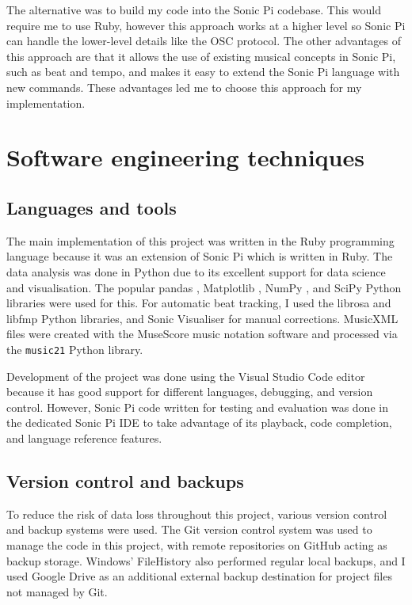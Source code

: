 \documentclass[12pt,twoside,openright]{report}
\begin{document}
The alternative was to build my code into the Sonic Pi codebase. This would
require me to use Ruby, however this approach works at a higher level so Sonic Pi can
handle the lower-level details like the OSC protocol. The other advantages of this approach are
that it allows the use of existing musical concepts in Sonic Pi, such as beat and
tempo, and makes it easy to extend the Sonic Pi language with new commands.
These advantages led me to choose this approach for my implementation.



\section{Software engineering techniques} \label{software_engineering_techniques}

\subsection{Languages and tools} \label{languages_and_tools}

The main implementation of this project was written in the Ruby programming
language because it was an extension of Sonic Pi which is written in Ruby. The
data analysis was done in Python due to its excellent support for data science
and visualisation. The popular pandas \cite{reback2020,mckinney2010}, Matplotlib \cite{hunter2007}, NumPy \cite{harris2020}, and SciPy \cite{virtanen2020} Python
libraries were used for this. For automatic beat tracking, I used the librosa \cite{mcfee2021} and libfmp \cite{mueller2021} Python libraries, and Sonic Visualiser \cite{cannam2010} for manual corrections.
MusicXML \cite{good2001} files were created with the MuseScore music notation software and
processed via the \verb'music21' \cite{cuthbert2010} Python library.

Development of the project was done using the Visual Studio Code editor because
it has good support for different languages, debugging, and version control.
However, Sonic Pi code written for testing and evaluation was done in the
dedicated Sonic Pi IDE to take advantage of its playback, code completion, and
language reference features.


\subsection{Version control and backups}

To reduce the risk of data loss throughout this project, various version control
and backup systems were used. The Git version control system was used to manage
the code in this project, with remote repositories on GitHub acting as backup
storage. Windows' FileHistory also performed regular local backups, and I used
Google Drive as an additional external backup destination for project files not
managed by Git.
\end{document}
